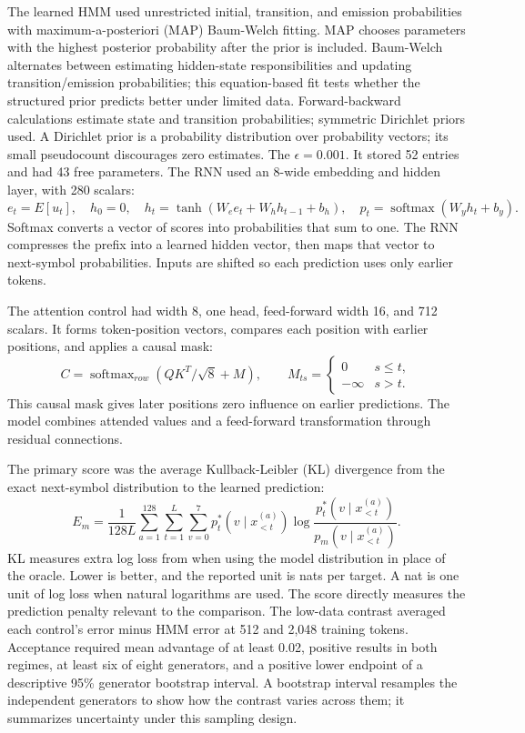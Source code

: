 The learned HMM used unrestricted initial, transition, and emission probabilities with maximum-a-posteriori (MAP) Baum-Welch fitting. MAP chooses parameters with the highest posterior probability after the prior is included. Baum-Welch alternates between estimating hidden-state responsibilities and updating transition/emission probabilities; this equation-based fit tests whether the structured prior predicts better under limited data. Forward-backward calculations estimate state and transition probabilities; symmetric Dirichlet priors used. A Dirichlet prior is a probability distribution over probability vectors; its small pseudocount discourages zero estimates. The $\epsilon=0.001$. It stored 52 entries and had 43 free parameters. The RNN used an 8-wide embedding and hidden layer, with 280 scalars:
\begin{equation}
e_t=E[u_t],\quad h_0=0,\quad h_t=\tanh(W_ee_t+W_hh_{t-1}+b_h),\quad p_t=\operatorname{softmax}(W_yh_t+b_y).
\end{equation}
Softmax converts a vector of scores into probabilities that sum to one. The RNN compresses the prefix into a learned hidden vector, then maps that vector to next-symbol probabilities. Inputs are shifted so each prediction uses only earlier tokens.

The attention control had width 8, one head, feed-forward width 16, and 712 scalars. It forms token-position vectors, compares each position with earlier positions, and applies a causal mask:
\begin{equation}
C=\operatorname{softmax}_{row}(QK^T/\sqrt8+M),\qquad M_{ts}=\begin{cases}0&s\le t,\\-\infty&s>t.\end{cases}
\end{equation}
This causal mask gives later positions zero influence on earlier predictions. The model combines attended values and a feed-forward transformation through residual connections.

The primary score was the average Kullback-Leibler (KL) divergence from the exact next-symbol distribution to the learned prediction:
\begin{equation}
E_m=\frac{1}{128L}\sum_{a=1}^{128}\sum_{t=1}^{L}\sum_{v=0}^{7}p_t^*(v\mid x_{<t}^{(a)})\log\frac{p_t^*(v\mid x_{<t}^{(a)})}{p_m(v\mid x_{<t}^{(a)})}.
\end{equation}
KL measures extra log loss from when using the model distribution in place of the oracle. Lower is better, and the reported unit is nats per target. A nat is one unit of log loss when natural logarithms are used. The score directly measures the prediction penalty relevant to the comparison. The low-data contrast averaged each control's error minus HMM error at 512 and 2,048 training tokens. Acceptance required mean advantage of at least 0.02, positive results in both regimes, at least six of eight generators, and a positive lower endpoint of a descriptive 95\% generator bootstrap interval. A bootstrap interval resamples the independent generators to show how the contrast varies across them; it summarizes uncertainty under this sampling design.

